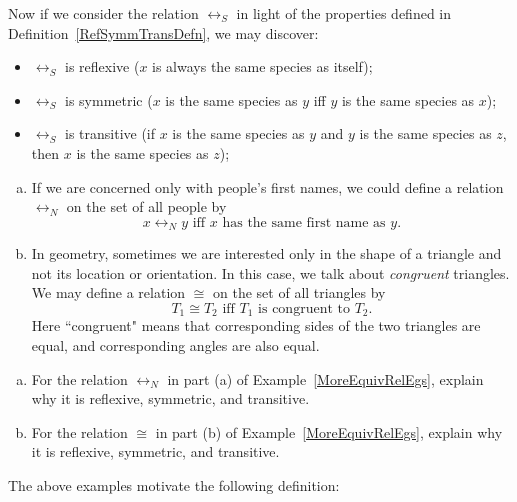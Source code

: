 Now if we consider the relation $\rel_S$ in light of the properties defined in Definition~\ref{RefSymmTransDefn}, we may discover:
\begin{itemize}
\item  $\rel_S$ is reflexive ($x$ is always the same species as itself);
\item  $\rel_S$ is symmetric ($x$ is the same species as $y$ iff $y$ is the same species as $x$);
\item  $\rel_S$ is transitive (if $x$ is the same species as $y$ and $y$ is the same species as $z$, then $x$ is the same species as $z$);
\end{itemize}

\begin{eg} \label{MoreEquivRelEgs}
\begin{enumerate}[(a)]
\item
If we are concerned only with people's first names, we could define a relation~$\rel_N$ on the set of all people by 
\[  x \rel_N y  \text{~iff~} x \text{ has the same first name as }y.  \]
\item In geometry, sometimes we are interested only in the shape of a triangle and not its location or orientation. In this case, we talk about \emph{congruent} triangles. We may define a relation $\cong$ on the set of all triangles by 
\[T_1 \cong T_2  \text{ iff } T_1  \text{ is congruent  to } T_2. \]
Here ``congruent" means that corresponding sides of the two triangles are equal, and corresponding angles are also equal.
\end{enumerate}
\end{eg}

\begin{exercise}{}
\begin{enumerate}[(a)]
\item
For the relation $\rel_N$ in part (a) of Example~\ref{MoreEquivRelEgs}, explain why it is reflexive, symmetric, and transitive.
\item
For the relation $\cong$ in part (b) of Example~\ref{MoreEquivRelEgs}, explain why it is reflexive, symmetric, and transitive.

\end{enumerate}
\end{exercise}

The above examples motivate the following definition:

